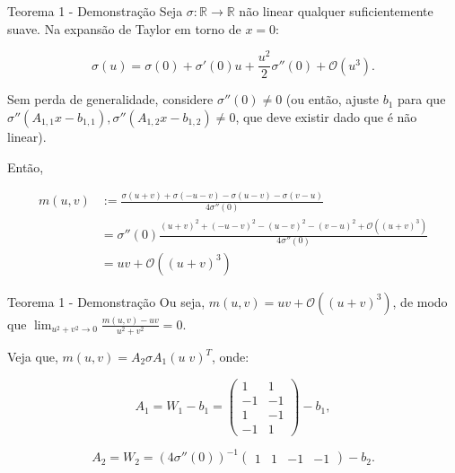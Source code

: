 \documentclass{beamer}
\begin{document}
\begin{frame}{Teorema 1 - Demonstração}
    \small
    Seja $\sigma:\mathbb R \to \mathbb R$ não linear qualquer suficientemente suave. Na expansão de Taylor em torno de $x=0$:

    \[
        \sigma(u) = \sigma(0) + \sigma'(0)u + \frac{u^2}{2} \sigma''(0) + \mathcal O(u^3).
    \]

    Sem perda de generalidade, considere $\sigma''(0) \neq 0$ (ou então, ajuste $b_1$ para que $\sigma''(A_{1,1}x-b_{1,1}),\sigma''(A_{1,2}x-b_{1,2})\neq0$, que deve existir dado que é não linear). 

    \vspace{1em}
    \pause

    Então,

    \begin{align*}
        m(u,v) &:= \frac{\sigma(u+v)+\sigma(-u-v)-\sigma(u-v)-\sigma(v-u)}{4\sigma''(0)} \\ 
        &= \sigma''(0) \frac{(u+v)^2 + (-u-v)^2 - (u-v)^2 - (v-u)^2  + \mathcal O((u+v)^3)}{4\sigma''(0)}  \\
        &= uv + \mathcal O((u+v)^3)
    \end{align*}
\end{frame}


\begin{frame}{Teorema 1 - Demonstração}
    Ou seja, $m(u,v) = uv + \mathcal O((u+v)^3)$, de modo que $\lim_{u^2+v^2 \to 0} \frac{m(u,v)-uv}{u^2+v^2} = 0$. 
    
    \pause

    Veja que, $m(u,v) = A_2 \sigma A_1 (u \; v)^T$, onde:

    \begin{equation*}
        A_1 = W_1 - b_1= \begin{pmatrix}
            1 & 1 \\
            -1 & -1 \\
            1 & -1 \\
            -1 & 1
        \end{pmatrix} - b_1,
    \end{equation*}

    \begin{equation*}
        A_2 = W_2 = (4\sigma''(0))^{-1} \begin{pmatrix}
            1 & 1 & -1 & -1
        \end{pmatrix} -b_2.
    \end{equation*}

    \pause
    \vspace{1em}
\end{frame}
\end{document}
